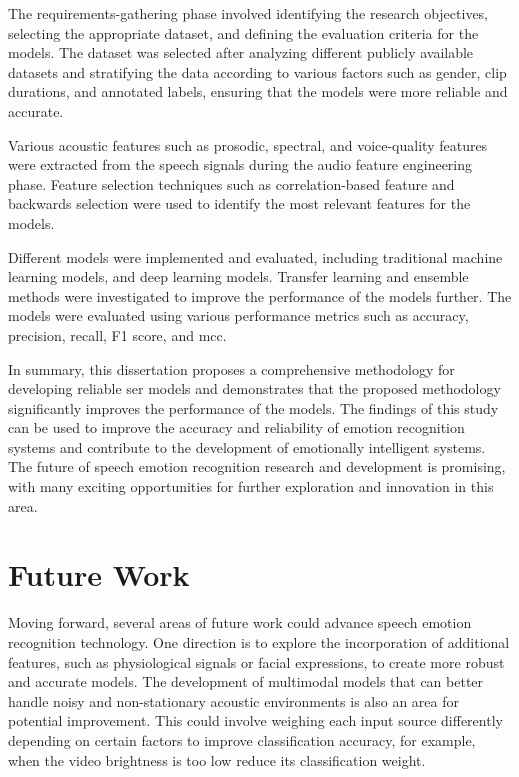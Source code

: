 The requirements-gathering phase involved identifying the research objectives, selecting the appropriate dataset, and defining the evaluation criteria for the models. The dataset was selected after analyzing different publicly available datasets and stratifying the data according to various factors such as gender, clip durations, and annotated labels, ensuring that the models were more reliable and accurate.

Various acoustic features such as prosodic, spectral, and voice-quality features were extracted from the speech signals during the audio feature engineering phase. Feature selection techniques such as correlation-based feature and backwards selection were used to identify the most relevant features for the models.

Different models were implemented and evaluated, including traditional machine learning models, and deep learning models. Transfer learning and ensemble methods were investigated to improve the performance of the models further. The models were evaluated using various performance metrics such as accuracy, precision, recall, F1 score, and \ac{mcc}.

In summary, this dissertation proposes a comprehensive methodology for developing reliable \ac{ser} models and demonstrates that the proposed methodology significantly improves the performance of the models. The findings of this study can be used to improve the accuracy and reliability of emotion recognition systems and contribute to the development of emotionally intelligent systems. The future of speech emotion recognition research and development is promising, with many exciting opportunities for further exploration and innovation in this area.


\section{Future Work}

Moving forward, several areas of future work could advance speech emotion recognition technology. One direction is to explore the incorporation of additional features, such as physiological signals or facial expressions, to create more robust and accurate models. The development of multimodal models that can better handle noisy and non-stationary acoustic environments is also an area for potential improvement. This could involve weighing each input source differently depending on certain factors to improve classification accuracy, for example, when the video brightness is too low reduce its classification weight.

